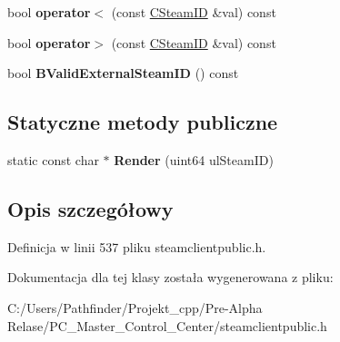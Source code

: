 \begin{DoxyCompactItemize}
\item 
\mbox{\label{class_c_steam_i_d_a502b2bb9721916521d48f225f1f36fc7}} 
bool {\bfseries operator$<$} (const \hyperlink{class_c_steam_i_d}{C\+Steam\+ID} \&val) const
\item 
\mbox{\label{class_c_steam_i_d_ae70956c9d68e59b0b3e551e27a72a359}} 
bool {\bfseries operator$>$} (const \hyperlink{class_c_steam_i_d}{C\+Steam\+ID} \&val) const
\item 
\mbox{\label{class_c_steam_i_d_a0ad3c05a76f65c5af5338d7b5a9d0f1e}} 
bool {\bfseries B\+Valid\+External\+Steam\+ID} () const
\end{DoxyCompactItemize}
\subsection*{Statyczne metody publiczne}
\begin{DoxyCompactItemize}
\item 
\mbox{\label{class_c_steam_i_d_a8298a87b2205ac5b3866052fa378542c}} 
static const char $\ast$ {\bfseries Render} (uint64 ul\+Steam\+ID)
\end{DoxyCompactItemize}


\subsection{Opis szczegółowy}


Definicja w linii 537 pliku steamclientpublic.\+h.



Dokumentacja dla tej klasy została wygenerowana z pliku\+:\begin{DoxyCompactItemize}
\item 
C\+:/\+Users/\+Pathfinder/\+Projekt\+\_\+cpp/\+Pre-\/\+Alpha Relase/\+P\+C\+\_\+\+Master\+\_\+\+Control\+\_\+\+Center/steamclientpublic.\+h\end{DoxyCompactItemize}
